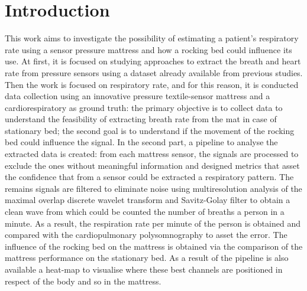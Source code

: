 
\chapter{Introduction}

\begin{comment}
l'intro ha una sua struttura, in 3 parti (sigh ho già scritto questa 
storia decine di volte, ma mai in generale per darla poi come lettura 
a chi deve fare l'intro per la prima volta): da 0.5 a 1 pagina di super-short-intro, 
questa parte non ho citazioni biblio, inizia con la stringa "scopo di questo lavoro è" 
e dice solo cosa è stato fatto. 
la seconda parte è quella corposa (massomeno da 2 
a 5 pagine) e "gronda citrazioni" e descrive cosa è stato fatto dando anche il contesto
(che ovviamente non ci sta in 0.5 - 1 pagina). la terza parte è la solita cavolata 
dell'indice in forma discorsiva (nel capitolo x si descrive questo e quello..., e così via)

@online{sensomative,
howpublished = {\url{https://sensomative.com/}},
  note = "visited on dd.mm.yyyy"
  }
}

@online{sentex,
howpublished={\url{https://sensingtex.com}},
  note = "visited on dd.mm.yyyy"
  }
}
\end{comment}


This work aims to investigate the possibility of estimating a patient's respiratory rate using a sensor pressure mattress and how a rocking bed could influence its use. 
At first, it is focused on studying approaches to extract the breath and heart rate from pressure sensors using a dataset already available from previous studies. 
Then the work is focused on respiratory rate, and for this reason, it is conducted data collection using an innovative pressure textile-sensor mattress and a cardiorespiratory as ground truth: the primary objective is to collect data to understand the feasibility of extracting breath rate from the mat in case of stationary bed; the second goal is to understand if the movement of the rocking bed could influence the signal. 
In the second part, a pipeline to analyse the extracted data is created: from each mattress sensor, the signals are processed to exclude the ones without meaningful information and designed metrics that asset the confidence that from a sensor could be extracted a respiratory pattern. The remains signals are filtered to eliminate noise using multiresolution analysis of the maximal overlap discrete wavelet transform and Savitz-Golay filter to obtain a clean wave from which could be counted the number of breaths a person in a minute. As a result, the respiration rate per minute of the person is obtained and compared with the cardiopulmonary polysomnography to asset the error. The influence of the rocking bed on the mattress is obtained via the comparison of the mattress performance on the stationary bed. As a result of the pipeline is also available a heat-map to visualise where these best channels are positioned in respect of the body and so in the mattress.


